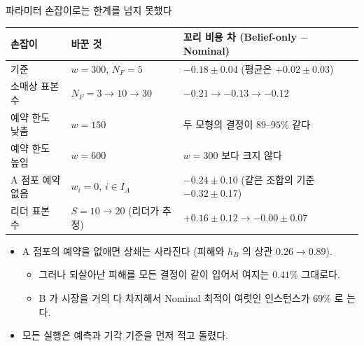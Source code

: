 \documentclass[aspectratio=169,11pt]{beamer}
\begin{document}
\begin{frame}{파라미터 손잡이로는 한계를 넘지 못했다}
\begin{center}
\small
\begin{tabular}{lll}
\toprule
손잡이 & 바꾼 것 & 꼬리 비용 차 (Belief-only $-$ Nominal)\\
\midrule
기준 & $w = 300$, $N_F = 5$ & $-0.18 \pm 0.04$ \;(평균은 $+0.02 \pm 0.03$)\\
소매상 표본 수 & $N_F = 3 \to 10 \to 30$ & $-0.21 \to -0.13 \to -0.12$\\
예약 한도 낮춤 & $w = 150$ & 두 모형의 결정이 $89$--$95\%$ 같다\\
예약 한도 높임 & $w = 600$ & $w = 300$ 보다 크지 않다\\
A 점포 예약 없음 & $w_i = 0$, $i \in I_A$ & $-0.24 \pm 0.10$ \;(같은 조합의 기준 $-0.32 \pm 0.17$)\\
리더 표본 수 & $S = 10 \to 20$ (리더가 추정) & $+0.16 \pm 0.12 \to -0.00 \pm 0.07$\\
\bottomrule
\end{tabular}
\end{center}
\begin{itemize}
  \item A 점포의 예약을 없애면 상쇄는 사라진다 (피해와 $h_B$ 의 상관 $0.26 \to 0.89$).
  \begin{itemize}
    \item 그러나 되살아난 피해를 모든 결정이 같이 입어서 여지는 $0.41\%$ 그대로다.
    \item B 가 시장을 거의 다 차지해서 Nominal 최적이 여럿인 인스턴스가 $69\%$ 로 는다.
  \end{itemize}
  \item 모든 실행은 예측과 기각 기준을 먼저 적고 돌렸다.
\end{itemize}
\end{frame}
\end{document}
